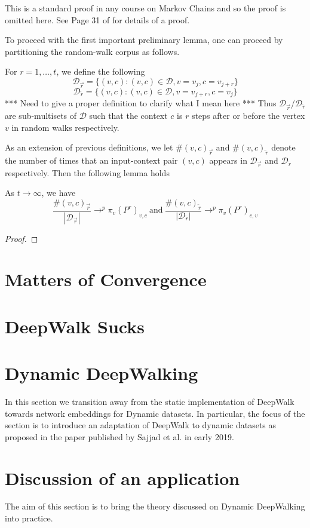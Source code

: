 \documentclass[a4paper]{article}
\newcommand{\D}{\mathcal D}
\newcommand{\rar}{\overrightarrow r}
\newcommand{\lar}{\overleftarrow r}
\begin{document}
This is a standard proof in any course on Markov Chains and so the proof is
omitted here. See Page 31 of \cite{markov_chains} for details of a proof.

To proceed with the first important preliminary lemma, one can proceed by
partitioning the random-walk corpus as follows.

\begin{definition}
  For $r = 1, \dots, t$, we define the following
  \[\D_{\rar} = \{ (v, c) : (v, c) \in \D, v = v_j, c = v_{j+r}\}\]
  \[\D_{\lar} = \{ (v, c) : (v, c) \in \D, v = v_{j+r}, c = v_{j}\}\]
  *** Need to give a proper definition to clarify what I mean here ***
  Thus $\D_{\rar}$/$\D_{\lar}$ are sub-multisets of $\D$ such that the context
  $c$ is $r$ steps after or before the vertex $v$ in random walks respectively.
\end{definition}

As an extension of previous definitions, we let $\#(v, c)_{\rar}$ and $\#(v,
c)_{\lar}$ denote the number of times that an input-context pair $(v,c)$ appears
in $\D_{\rar}$ and $\D_{\lar}$ respectively. Then the following lemma holds
\begin{lemma}
  As $t \to \infty$, we have
  \[\frac{\#(v, c)_{\rar}}{|\D_{\rar}|} \to^{p} \pi_v(P^r)_{v,c} \  \text{and}
    \ \frac{\#(v, c)_{\lar}}{|\D_{\lar}|} \to^{p} \pi_v(P^r)_{c,v} \]
\end{lemma}
\begin{proof}
  \end{proof}


\section{Matters of Convergence}
\section{DeepWalk Sucks}
\section{Dynamic DeepWalking}
In this section we transition away from the static implementation of DeepWalk
towards network embeddings for Dynamic datasets. In particular, the focus of the
section is to introduce an adaptation of DeepWalk to dynamic datasets as
proposed in the paper published by Sajjad et al.\cite{sajjad2019} in early
2019.\\

\section{Discussion of an application}

The aim of this section is to bring the theory discussed on Dynamic DeepWalking
into practice.






\printindex
\end{document}
